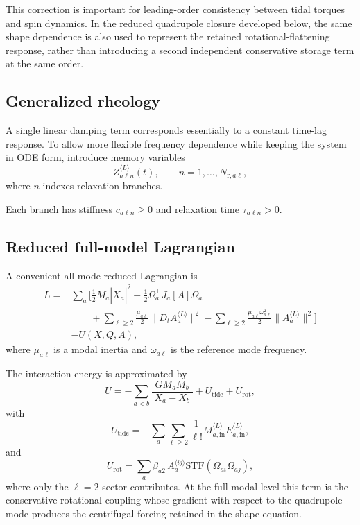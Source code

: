 \documentclass[journal, a4paper]{IEEEtran}
\begin{document}
This correction is important for leading-order consistency between tidal
torques and spin dynamics. In the reduced quadrupole closure developed below,
the same shape dependence is also used to represent the retained
rotational-flattening response, rather than introducing a second independent
conservative storage term at the same order.

\subsection{Generalized rheology}

A single linear damping term corresponds essentially to a constant
time-lag response. To allow more flexible frequency dependence while keeping
the system in ODE form, introduce memory variables
\begin{equation}
Z_{a\ell n}^{\langle L\rangle}(t),
\qquad
n=1,\dots,N_{\mathrm{r},a\ell},
\label{eq:Zdef}
\end{equation}
where $n$ indexes relaxation branches.

Each branch has stiffness $c_{a\ell n}\ge0$ and relaxation time
$\tau_{a\ell n}>0$.

\subsection{Reduced full-model Lagrangian}

A convenient all-mode reduced Lagrangian is
\begin{align}
L
=&
\sum_a
\Bigg[
\frac{1}{2} M_a |\dot X_a|^2
+
\frac{1}{2}\Omega_a^\top J_a[A]\Omega_a
\nonumber\\
&\qquad
+
\sum_{\ell\ge2}
\frac{\mu_{a\ell}}{2}
\bigl\|D_t A_a^{\langle L\rangle}\bigr\|^2
-
\sum_{\ell\ge2}
\frac{\mu_{a\ell}\omega_{a\ell}^2}{2}
\bigl\|A_a^{\langle L\rangle}\bigr\|^2
\Bigg]\nonumber\\
&-U(X,Q,A),
\label{eq:Lreduced}
\end{align}
where $\mu_{a\ell}$ is a modal inertia and $\omega_{a\ell}$ is the reference
mode frequency.

The interaction energy is approximated by
\begin{equation}
U
=
-\sum_{a<b}
\frac{G M_a M_b}{|X_a-X_b|}
+
U_{\mathrm{tide}}
+
U_{\mathrm{rot}},
\label{eq:Ureduced}
\end{equation}
with
\begin{equation}
U_{\mathrm{tide}}
=
-\sum_a \sum_{\ell\ge2}
\frac{1}{\ell!}
M_{a,\mathrm{in}}^{\langle L\rangle}
E_{a,\mathrm{in}}^{\langle L\rangle},
\label{eq:Utide}
\end{equation}
and
\begin{equation}
U_{\mathrm{rot}}
=
\sum_a \beta_{a2}\,
A_a^{\langle ij\rangle}
\mathrm{STF}\!\left(\Omega_{ai}\Omega_{aj}\right),
\label{eq:UrotReduced}
\end{equation}
where only the $\ell=2$ sector contributes. At the full modal level this term
is the conservative rotational coupling whose gradient with respect to the
quadrupole mode produces the centrifugal forcing retained in the shape
equation.
\end{document}
